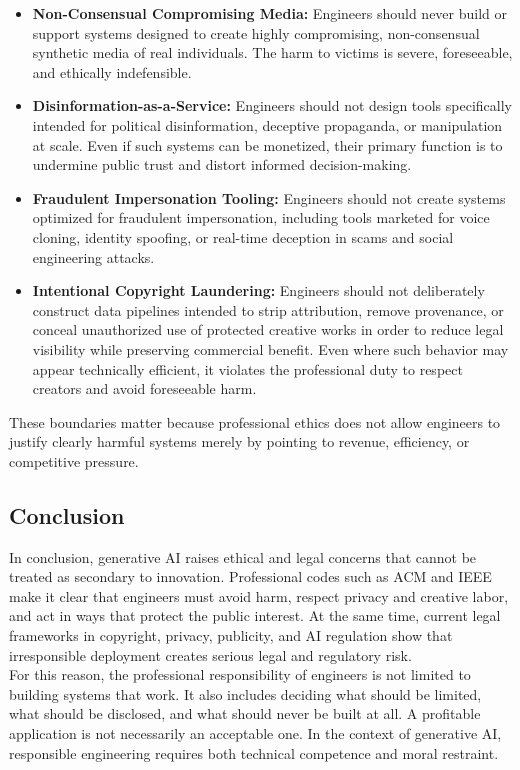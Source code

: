 \begin{itemize}
    \item \textbf{Non-Consensual Compromising Media:} Engineers should never build or support systems designed to create highly compromising, non-consensual synthetic media of real individuals. The harm to victims is severe, foreseeable, and ethically indefensible.

    \item \textbf{Disinformation-as-a-Service:} Engineers should not design tools specifically intended for political disinformation, deceptive propaganda, or manipulation at scale. Even if such systems can be monetized, their primary function is to undermine public trust and distort informed decision-making.

    \item \textbf{Fraudulent Impersonation Tooling:} Engineers should not create systems optimized for fraudulent impersonation, including tools marketed for voice cloning, identity spoofing, or real-time deception in scams and social engineering attacks.

    \item \textbf{Intentional Copyright Laundering:} Engineers should not deliberately construct data pipelines intended to strip attribution, remove provenance, or conceal unauthorized use of protected creative works in order to reduce legal visibility while preserving commercial benefit. Even where such behavior may appear technically efficient, it violates the professional duty to respect creators and avoid foreseeable harm.
\end{itemize}

These boundaries matter because professional ethics does not allow engineers to justify clearly harmful systems merely by pointing to revenue, efficiency, or competitive pressure.

\subsection{Conclusion}

In conclusion, generative AI raises ethical and legal concerns that cannot be treated as secondary to innovation. Professional codes such as ACM and IEEE make it clear that engineers must avoid harm, respect privacy and creative labor, and act in ways that protect the public interest. At the same time, current legal frameworks in copyright, privacy, publicity, and AI regulation show that irresponsible deployment creates serious legal and regulatory risk. \\

For this reason, the professional responsibility of engineers is not limited to building systems that work. It also includes deciding what should be limited, what should be disclosed, and what should never be built at all. A profitable application is not necessarily an acceptable one. In the context of generative AI, responsible engineering requires both technical competence and moral restraint.